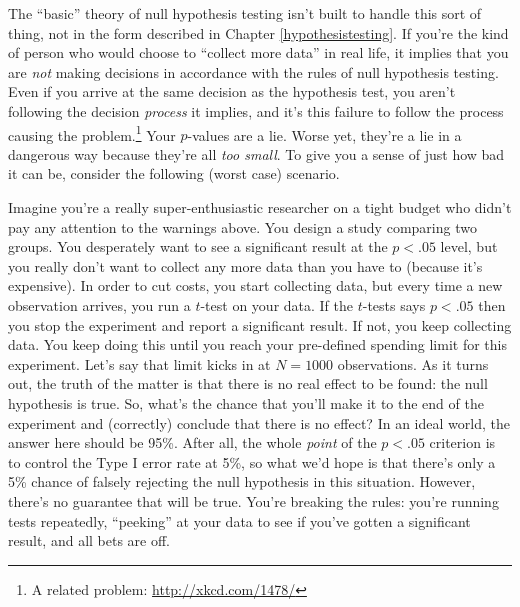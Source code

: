 \documentclass[
  11pt,
  a4paper,
  twoside,symmetric,openright]{book}
\theoremstyle{break}
\theoremstyle{break}
\begin{document}
The ``basic'' theory of null hypothesis testing isn't built to handle this sort of thing, not in the form described in Chapter \ref{hypothesistesting}. If you're the kind of person who would choose to ``collect more data'' in real life, it implies that you are \emph{not} making decisions in accordance with the rules of null hypothesis testing. Even if you arrive at the same decision as the hypothesis test, you aren't following the decision \emph{process} it implies, and it's this failure to follow the process causing the problem.\footnote{A related problem: \url{http://xkcd.com/1478/}} Your \(p\)-values are a lie. Worse yet, they're a lie in a dangerous way because they're all \emph{too small}. To give you a sense of just how bad it can be, consider the following (worst case) scenario.

Imagine you're a really super-enthusiastic researcher on a tight budget who didn't pay any attention to the warnings above. You design a study comparing two groups. You desperately want to see a significant result at the \(p<.05\) level, but you really don't want to collect any more data than you have to (because it's expensive). In order to cut costs, you start collecting data, but every time a new observation arrives, you run a \(t\)-test on your data. If the \(t\)-tests says \(p<.05\) then you stop the experiment and report a significant result. If not, you keep collecting data. You keep doing this until you reach your pre-defined spending limit for this experiment. Let's say that limit kicks in at \(N=1000\) observations. As it turns out, the truth of the matter is that there is no real effect to be found: the null hypothesis is true. So, what's the chance that you'll make it to the end of the experiment and (correctly) conclude that there is no effect? In an ideal world, the answer here should be 95\%. After all, the whole \emph{point} of the \(p<.05\) criterion is to control the Type I error rate at 5\%, so what we'd hope is that there's only a 5\% chance of falsely rejecting the null hypothesis in this situation. However, there's no guarantee that will be true. You're breaking the rules: you're running tests repeatedly, ``peeking'' at your data to see if you've gotten a significant result, and all bets are off.
\end{document}

